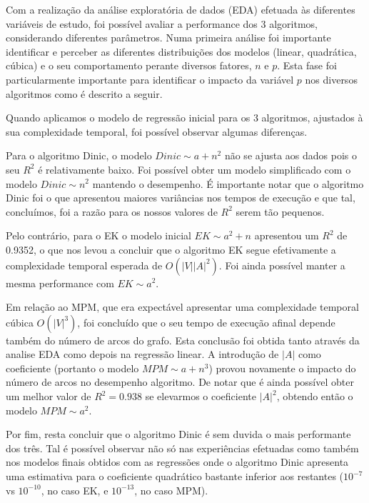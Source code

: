 \documentclass{uofa-eng-assignment}
\begin{document}
Com a realização da análise exploratória de dados (EDA) efetuada às diferentes variáveis de estudo, foi possível avaliar a performance dos 3 algoritmos, considerando diferentes parâmetros. 
Numa primeira análise foi importante identificar e perceber as diferentes distribuições dos modelos (linear, quadrática, cúbica)  e o seu comportamento perante diversos fatores, $n$ e $p$.
Esta fase foi particularmente importante para identificar o impacto da variável $p$ nos diversos algoritmos como é descrito a seguir.

Quando aplicamos o modelo de regressão inicial para os 3 algoritmos, ajustados à sua complexidade temporal, foi possível observar algumas diferenças.

Para o algoritmo Dinic, o modelo $Dinic \sim a + n^2$ não se ajusta aos dados pois o seu $R^2$ é relativamente baixo. Foi possível obter um modelo simplificado com o modelo $Dinic \sim n^2$ mantendo o desempenho. É importante notar que o algoritmo Dinic foi o que apresentou maiores variâncias nos tempos de execução e que tal, concluímos, foi a razão para os nossos valores de $R^2$ serem tão pequenos.

Pelo contrário, para o EK o modelo inicial $EK \sim a^2 + n$ apresentou um $R^2$ de 0.9352, o que nos levou a concluir que o algoritmo EK segue efetivamente a complexidade temporal esperada de $O(|V||A|^2)$. Foi ainda possível manter a mesma performance com $EK \sim a^2$.

Em relação ao MPM, que era expectável apresentar uma complexidade temporal cúbica $O(|V|^3)$, foi concluído que o seu tempo de execução afinal depende também do número de arcos do grafo. Esta conclusão foi obtida tanto através da analise EDA como depois na regressão linear. A introdução de $|A|$ como coeficiente (portanto o modelo $MPM \sim a + n^3$) provou novamente o impacto do número de arcos no desempenho algoritmo. De notar que é ainda possível obter um melhor valor de $R^2=0.938$ se elevarmos o coeficiente $|A|^2$, obtendo então o modelo $MPM \sim a^2$.

Por fim, resta concluir que o algoritmo Dinic é sem duvida o mais performante dos três. Tal é possível observar não só nas experiências efetuadas como também nos modelos finais obtidos com as regressões onde o algoritmo Dinic apresenta uma estimativa para o coeficiente quadrático bastante inferior aos restantes ($10^{-7}$ vs $10^{-10}$, no caso EK, e $10^{-13}$, no caso MPM).
\end{document}
